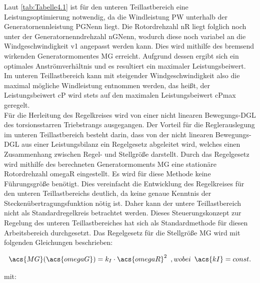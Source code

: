 Laut \autoref{tab:Tabelle4.1} ist für den unteren Teillastbereich eine Leistungsoptimierung notwendig, da die Windleistung \acs{PW} unterhalb der Generatornennleistung \acs{PGNenn} liegt. Die Rotordrehzahl \acs{nR} liegt folglich noch unter der Generatornenndrehzahl \acs{nGNenn}, wodurch diese noch variabel an die Windgeschwindigkeit \acs{v1} angepasst werden kann. Dies wird mithilfe des bremsend wirkenden Generatormomentes \acs{MG} erreicht. Aufgrund dessen ergibt sich ein optimales Anströmverhältnis und es resultiert ein maximaler Leistungsbeiwert. Im unteren Teillastbereich kann mit steigender Windgeschwindigkeit also die maximal mögliche Windleistung entnommen werden, das heißt, der Leistungsbeiwert \acs{cP} wird stets auf den maximalen Leistungsbeiwert \acs{cPmax} geregelt.
\\
Für die Herleitung des Regelkreises wird von einer nicht linearen Bewegungs-DGL des torsionsstarren Triebstrangs ausgegangen. Der Vorteil für die Reglerauslegung im unteren Teillastbereich besteht darin, dass von der nicht linearen Bewegungs-DGL aus einer Leistungsbilanz ein Regelgesetz abgeleitet wird, welches einen Zusammenhang zwischen Regel- und Stellgröße darstellt. Durch das Regelgesetz wird mithilfe des berechneten Generatormoments \acs{MG} eine stationäre Rotordrehzahl \acs{omegaR} eingestellt. Es wird für diese Methode keine Führungsgröße benötigt. Dies vereinfacht die Entwicklung des Regelkreises für den unteren Teillastbereichs deutlich, da keine genaue Kenntnis der Steckenübertragungsfunktion nötig ist. Daher kann der untere Teillastbereich nicht als Standardregelkreis betrachtet werden. Dieses \glqq Steuerungskonzept\grqq{} zur Regelung des unteren Teillastbereiches hat sich als Standardmethode für diesen Arbeitsbereich durchgesetzt. Das Regelgesetz für die Stellgröße \acs{MG} wird mit folgenden Gleichungen beschrieben:

\begin{align}
    \acs{MG}(\acs{omegaG}) = k_I \cdot \acs{omegaR}^2 \enspace ,wobei \enspace \acs{kI} = const.
    \label{eq:Gleichung4.1}
\end{align}

mit:

